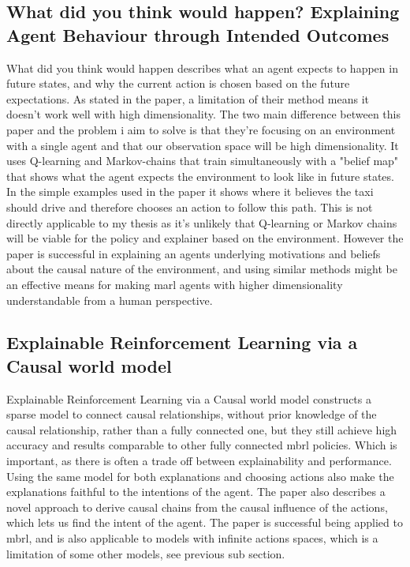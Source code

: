 \documentclass[UKenglish]{uiomasterthesis}
\begin{document}
\subsection{What did you think would happen? Explaining Agent Behaviour through Intended Outcomes}
What did you think would happen describes what an agent expects to happen in future states, and why the current action is chosen based on the future expectations. As stated in the paper, a limitation of their method means it doesn't work well with high dimensionality. The two main difference between this paper and the problem i aim to solve is that they're focusing on an environment with a single agent and that our observation space will be high dimensionality. It uses Q-learning and Markov-chains that train simultaneously with a "belief map" that shows what the agent expects the environment to look like in future states. In the simple examples used in the paper it shows where it believes the taxi should drive and therefore chooses an action to follow this path. This is not directly applicable to my thesis as it's unlikely that Q-learning or Markov chains will be viable for the policy and explainer based on the environment. However the paper is successful in explaining an agents underlying motivations and beliefs about the causal nature of the environment, and using similar methods might be an effective means for making \ac{marl} agents with higher dimensionality understandable from a human perspective. %

\subsection{Explainable Reinforcement Learning via a Causal world model}
Explainable Reinforcement Learning via a Causal world model constructs a sparse model to connect causal relationships, without prior knowledge of the causal relationship, rather than a fully connected one, but they still achieve high accuracy and results comparable to other fully connected \ac{mbrl} policies. Which is important, as there is often a trade off between explainability and performance. Using the same model for both explanations and choosing actions also make the explanations faithful to the intentions of the agent. The paper also describes a novel approach to derive causal chains from the causal influence of the actions, which lets us find the intent of the agent. The paper is successful being applied to \ac{mbrl}, and is also applicable to models with infinite actions spaces, which is a limitation of some other models, see previous sub section.
\end{document}
